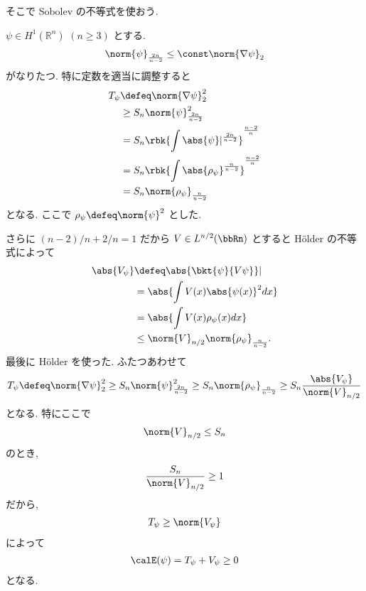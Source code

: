 \documentclass[openany, a4paper, oneside]{jsbook}
\begin{document}
そこで Sobolev の不等式を使おう.
\begin{thm}
$\psi \in H^1(\mathbb{R}^n)$ $(n \geq 3)$ とする.
\begin{align}
 \norm{\psi}_{\frac{2n}{n-2}}
 \leq
 \const
 \norm{\nabla \psi}_2
\end{align}
がなりたつ.
特に定数を適当に調整すると
\begin{align}
 T_{\psi}
 &\defeq
 \norm{\nabla \psi}_2^2 \\
 &\geq
 S_n \norm{\psi}_{\frac{2n}{n-2}}^2 \\
 &=
 S_n \rbk{\int \abs{\psi}|^{\frac{2n}{n-2}}}^{\frac{n-2}{n}} \\
 &=
 S_n \rbk{\int \abs{\rho_{\psi}}^{\frac{n}{n-2}}}^{\frac{n-2}{n}} \\
 &=
 S_n \norm{\rho_{\psi}}_{\frac{n}{n-2}}
\end{align}
となる.
ここで $\rho_{\psi} \defeq \norm{\psi}^2$ とした.
\end{thm}
さらに $(n-2)/n + 2/n = 1$ だから $V \in L^{n/2}(\bbRn)$ とすると H\"older の不等式によって
\begin{align}
 \abs{V_{\psi}}
 &\defeq
 \abs{\bkt{\psi}{V \psi}}| \\
 &=
 \abs{\int V(x) \abs{\psi(x)}^2 dx} \\
 &=
 \abs{\int V(x) \rho_{\psi}(x) dx} \\
 &\leq
 \norm{V}_{n/2} \norm{\rho_{\psi}}_{\frac{n}{n-2}}.
\end{align}
最後に H\"older を使った.
ふたつあわせて
\begin{align}
 T_{\psi}
 \defeq
 \norm{\nabla \psi}_2^2
 \geq
 S_n \norm{\psi}_{\frac{2n}{n-2}}^2
 \geq
 S_n \norm{\rho_{\psi}}_{\frac{n}{n-2}}
 \geq
 S_n \frac{\abs{V_{\psi}}}{\norm{V}_{n/2}}
\end{align}
となる.
特にここで
\begin{align}
 \norm{V}_{n/2} \leq S_n
\end{align}
のとき,
\begin{align}
 \frac{S_n}{\norm{V}_{n/2}} \geq 1
\end{align}
だから,
\begin{align}
 T_{\psi} \geq \norm{V_{\psi}}
\end{align}
によって
\begin{align}
 \calE (\psi) = T_{\psi} + V_{\psi}
 \geq 0
\end{align}
となる.
\end{document}
